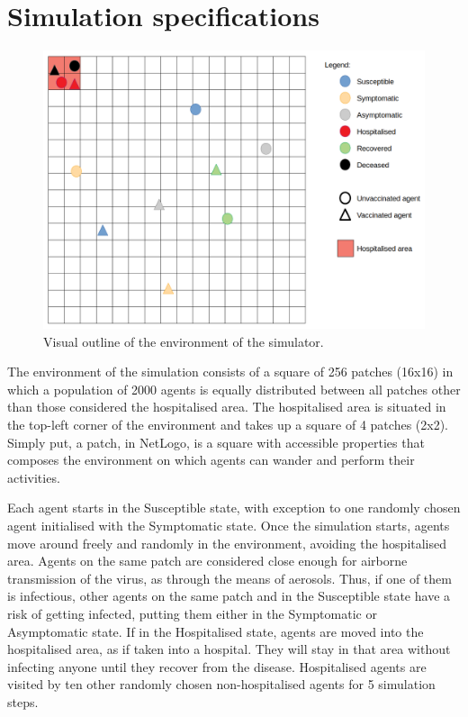 \section{Simulation specifications}

\begin{figure}
    \centering
    \includegraphics[width=0.9\linewidth]{pics/simulation_figure.png}
    \caption{Visual outline of the environment of the simulator.}
    \label{fig:simulation_environment}
\end{figure}

The environment of the simulation consists of a square of 256 patches (16x16) in which a population of 2000 agents is equally distributed between all patches other than those considered the hospitalised area. The hospitalised area is situated in the top-left corner of the environment and takes up a square of 4 patches (2x2). Simply put, a patch, in NetLogo, is a square with accessible properties that composes the environment on which agents can wander and perform their activities.

Each agent starts in the Susceptible state, with exception to one randomly chosen agent initialised with the Symptomatic state. Once the simulation starts, agents move around freely and randomly in the environment, avoiding the hospitalised area. Agents on the same patch are considered close enough for airborne transmission of the virus, as through the means of aerosols. Thus, if one of them is infectious, other agents on the same patch and in the Susceptible state have a risk of getting infected, putting them either in the Symptomatic or Asymptomatic state. If in the Hospitalised state, agents are moved into the hospitalised area, as if taken into a hospital. They will stay in that area without infecting anyone until they recover from the disease. Hospitalised agents are visited by ten other randomly chosen non-hospitalised agents for 5 simulation steps.

